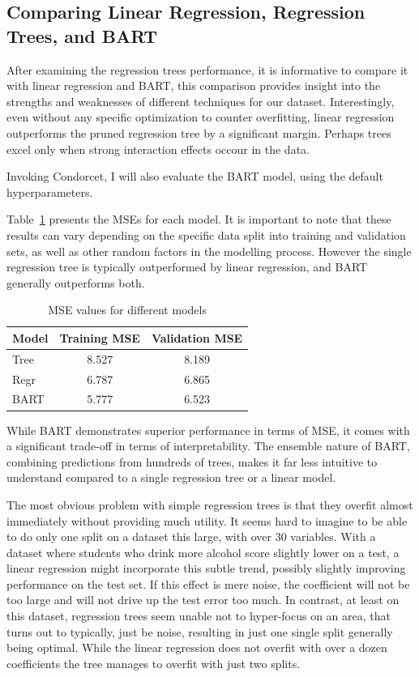 \documentclass[12pt]{article}
\begin{document}
\subsection{Comparing Linear Regression, Regression Trees, and BART}

After examining the regression trees performance, it is informative to compare it with linear regression and BART, this comparison provides insight into the strengths and weaknesses of different techniques for our dataset. Interestingly, even without any specific optimization to counter overfitting, linear regression outperforms the pruned regression tree by a significant margin. Perhaps trees excel only when strong interaction effects occour in the data.

Invoking Condorcet, I will also evaluate the BART model, using the default hyperparameters.

Table~\ref{big_comparison} presents the MSEs for each model. It is important to note that these results can vary depending on the specific data split into training and validation sets, as well as other random factors in the modelling process. However the single regression tree is typically outperformed by linear regression, and BART generally outperforms both.

\begin{table}
    \centering
    \begin{tabular}{| l | c | c |}
        \hline
        Model & Training MSE & Validation MSE \\
        \hline
        Tree  & 8.527        & 8.189          \\
        Regr  & 6.787        & 6.865          \\
        BART  & 5.777        & 6.523          \\
        \hline
    \end{tabular}
    \caption{MSE values for different models}
    \label{big_comparison}
\end{table}

While BART demonstrates superior performance in terms of MSE, it comes with a significant trade-off in terms of interpretability. The ensemble nature of BART, combining predictions from hundreds of trees, makes it far less intuitive to understand compared to a single regression tree or a linear model.

The most obvious problem with simple regression trees is that they overfit almost immediately without providing much utility. It seems hard to imagine to be able to do only one split on a dataset this large, with over 30 variables. With a dataset where students who drink more alcohol score slightly lower on a test, a linear regression might incorporate this subtle trend, possibly slightly improving performance on the test set. If this effect is mere noise, the coefficient will not be too large and will not drive up the test error too much. In contrast, at least on this dataset, regression trees seem unable not to hyper-focus on an area, that turns out to typically, just be noise, resulting in just one single split generally being optimal. While the linear regression does not overfit with over a dozen coefficients the tree manages to overfit with just two splits.
\end{document}
